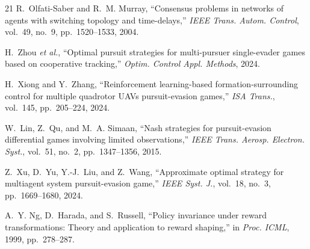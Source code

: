 \documentclass[conference]{IEEEtran}
\begin{document}
\begin{thebibliography}{21}
R.~Olfati-Saber and R.~M. Murray, ``Consensus problems in networks of agents with switching topology and time-delays,'' \emph{IEEE Trans. Autom. Control}, vol.~49, no.~9, pp.~1520--1533, 2004.

H.~Zhou \emph{et al.}, ``Optimal pursuit strategies for multi-pursuer single-evader games based on cooperative tracking,'' \emph{Optim. Control Appl. Methods}, 2024.

H.~Xiong and Y.~Zhang, ``Reinforcement learning-based formation-surrounding control for multiple quadrotor UAVs pursuit-evasion games,'' \emph{ISA Trans.}, vol.~145, pp.~205--224, 2024.

W.~Lin, Z.~Qu, and M.~A. Simaan, ``Nash strategies for pursuit-evasion differential games involving limited observations,'' \emph{IEEE Trans. Aerosp. Electron. Syst.}, vol.~51, no.~2, pp.~1347--1356, 2015.

Z.~Xu, D.~Yu, Y.-J.~Liu, and Z.~Wang, ``Approximate optimal strategy for multiagent system pursuit-evasion game,'' \emph{IEEE Syst. J.}, vol.~18, no.~3, pp.~1669--1680, 2024.

A.~Y. Ng, D.~Harada, and S.~Russell, ``Policy invariance under reward transformations: Theory and application to reward shaping,'' in \emph{Proc. ICML}, 1999, pp.~278--287.

\end{thebibliography}
\end{document}
